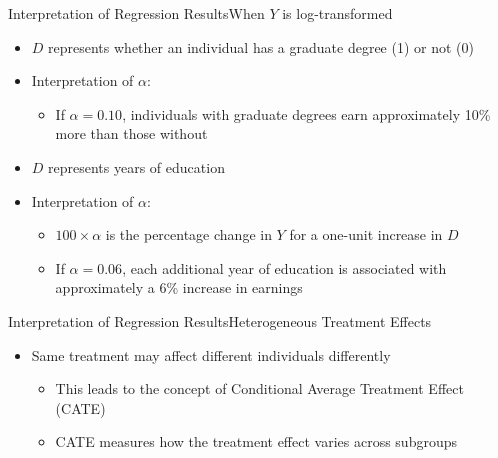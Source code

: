 \documentclass[dvipsnames,hyperref={pdfpagelabels=false}]{beamer}
\begin{document}
\begin{frame}{Interpretation of Regression Results}{When $Y$ is log-transformed}
	\begin{itemize}
		\item $D$ represents whether an individual has a graduate degree (1) or not (0)
		\vspace{0.2cm}
		\item Interpretation of $\alpha$:
				\vspace{0.2cm}
		\begin{itemize}
			\item If $\alpha = 0.10$, individuals with graduate degrees earn approximately 10\% more than those without
							\vspace{0.2cm}
		\end{itemize}
	\item  $D$ represents years of education
	\vspace{0.2cm}
	\item Interpretation of $\alpha$:
		\vspace{0.2cm}
	\begin{itemize}
					\item $100 \times \alpha$ is the percentage change in $Y$ for a one-unit increase in $D$
						\vspace{0.2cm}
		\item If $\alpha = 0.06$, each additional year of education is associated with approximately a 6\% increase in earnings
	\end{itemize}
	\end{itemize}
\end{frame}


\begin{frame}{Interpretation of Regression Results}{Heterogeneous Treatment Effects}
	\begin{itemize}
		\item Same treatment may affect different individuals differently
		\vspace{0.2cm}
			\begin{itemize}
		\item This leads to the concept of Conditional Average Treatment Effect (CATE)
		\vspace{0.2cm}
		\item CATE measures how the treatment effect varies across subgroups
		\vspace{0.2cm}
			\end{itemize}
	
		
		
	\end{itemize}
\end{frame}
\end{document}
